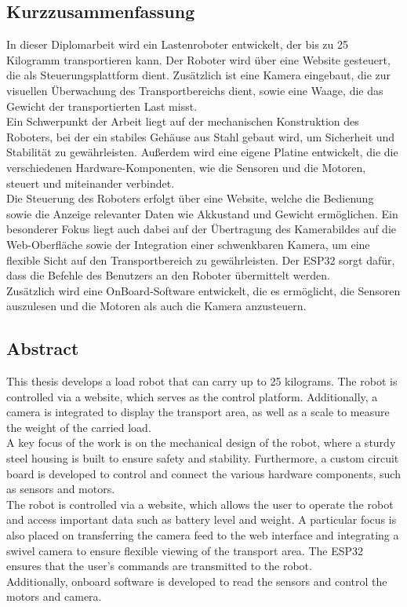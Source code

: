 \documentclass[ngerman,12pt,a4paper]{article}
\begin{document}
	\subsection{Kurzzusammenfassung}
	In dieser Diplomarbeit wird ein Lastenroboter entwickelt, der bis zu 25 Kilogramm transportieren kann. Der Roboter wird über eine Website gesteuert, die als Steuerungsplattform dient. Zusätzlich ist eine Kamera eingebaut, die zur visuellen Überwachung des Transportbereichs dient, sowie eine Waage, die das Gewicht der transportierten Last misst.\\[0.5 cm]
	Ein Schwerpunkt der Arbeit liegt auf der mechanischen Konstruktion des Roboters, bei der ein stabiles Gehäuse aus Stahl gebaut wird, um Sicherheit und Stabilität zu gewährleisten. Außerdem wird eine eigene Platine entwickelt, die die verschiedenen Hardware-Komponenten, wie die Sensoren und die Motoren, steuert und miteinander verbindet.\\[0.5 cm]
	Die Steuerung des Roboters erfolgt über eine Website, welche die Bedienung sowie die Anzeige relevanter Daten wie Akkustand und Gewicht ermöglichen. Ein besonderer Fokus liegt auch dabei auf der Übertragung des Kamerabildes auf die Web-Oberfläche sowie der Integration einer schwenkbaren Kamera, um eine flexible Sicht auf den Transportbereich zu gewährleisten. Der ESP32 sorgt dafür, dass die Befehle des Benutzers an den Roboter übermittelt werden.\\[0.5 cm]
	Zusätzlich wird eine OnBoard-Software entwickelt, die es ermöglicht, die Sensoren auszulesen und die Motoren als auch die Kamera anzusteuern.\\[0.5 cm]
	
	\newpage
	
	\subsection{Abstract}
	
	This thesis develops a load robot that can carry up to 25 kilograms. The robot is controlled via a website, which serves as the control platform. Additionally, a camera is integrated to display the transport area, as well as a scale to measure the weight of the carried load.\\[0.5 cm]
	A key focus of the work is on the mechanical design of the robot, where a sturdy steel housing is built to ensure safety and stability. Furthermore, a custom circuit board is developed to control and connect the various hardware components, such as sensors and motors.\\[0.5 cm]
	The robot is controlled via a website, which allows the user to operate the robot and access important data such as battery level and weight. A particular focus is also placed on transferring the camera feed to the web interface and integrating a swivel camera to ensure flexible viewing of the transport area. The ESP32 ensures that the user's commands are transmitted to the robot.\\[0.5 cm]
	Additionally, onboard software is developed to read the sensors and control the motors and camera.
	\thispagestyle{fancy}
	\newpage
\end{document}
